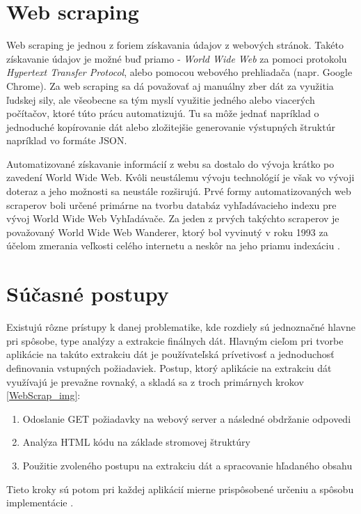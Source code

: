 \section{Web scraping}

Web scraping je jednou z foriem získavania údajov z webových stránok. Takéto získavanie údajov je možné buď priamo - \textit{World Wide Web} za pomoci protokolu \textit{Hypertext Transfer Protocol}, alebo pomocou webového prehliadača (napr. Google Chrome). Za web scraping sa dá považovať aj manuálny zber dát za využitia ľudskej sily, ale všeobecne sa tým myslí využitie jedného alebo viacerých počítačov, ktoré túto prácu automatizujú. Tu sa môže jednať napríklad o jednoduché kopírovanie dát alebo zložitejšie generovanie výstupných štruktúr napríklad vo formáte JSON.

Automatizované získavanie informácií z webu sa dostalo do vývoja krátko po zavedení World Wide Web. Kvôli neustálemu vývoju technológií je však vo vývoji doteraz a jeho možnosti sa neustále rozširujú. Prvé formy automatizovaných web scraperov boli určené primárne na tvorbu databáz vyhľadávacieho indexu pre vývoj World Wide Web Vyhľadávače. Za jeden z prvých takýchto scraperov je považovaný World Wide Web Wanderer, ktorý bol vyvinutý v roku 1993 za účelom zmerania veľkosti celého internetu a neskôr na jeho priamu indexáciu \cite{online:how_does_scraping_work}. 

\section{Súčasné postupy}

Existujú rôzne prístupy k danej problematike, kde rozdiely sú jednoznačné hlavne pri spôsobe, type analýzy a extrakcie finálnych dát. Hlavným cieľom pri tvorbe aplikácie na takúto extrakciu dát je používateľská prívetivosť a jednoduchosť definovania vstupných požiadaviek. Postup, ktorý aplikácie na extrakciu dát využívajú je prevažne rovnaký, a skladá sa z troch primárnych krokov \ref{WebScrap_img}:
\begin{enumerate}
  \item{Odoslanie GET požiadavky na webový server a následné obdržanie odpovedi}
  \item{Analýza HTML kódu na základe stromovej štruktúry}
  \item{Použitie zvoleného postupu na extrakciu dát a spracovanie hľadaného obsahu}
\end{enumerate}

Tieto kroky sú potom pri každej aplikácií mierne prispôsobené určeniu a spôsobu implementácie \cite{online:how_does_scraping_work}. 

